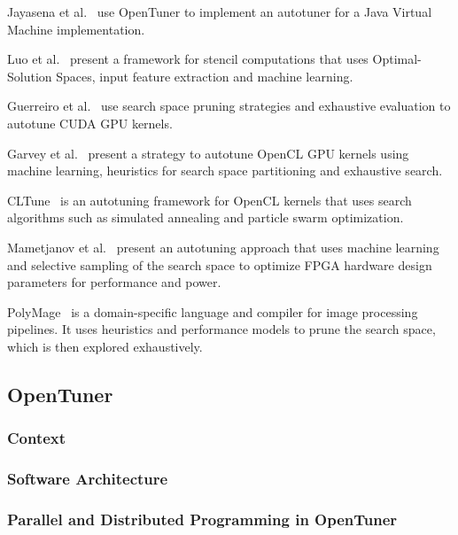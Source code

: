 Jayasena et al.~\cite{jayasena2015auto} use OpenTuner to implement an autotuner
for a Java Virtual Machine implementation.

Luo et al.~\cite{luo2015fast} present a framework for stencil computations that
uses Optimal-Solution Spaces, input feature extraction and machine learning.

Guerreiro et al.~\cite{guerreiro2015multi} use search space pruning strategies
and exhaustive evaluation to autotune CUDA GPU kernels.

Garvey et al.~\cite{garvey2015automatic} present a strategy to autotune OpenCL
GPU kernels using machine learning, heuristics for search space partitioning
and exhaustive search.

CLTune~\cite{nugteren2015cltune} is an autotuning framework for OpenCL kernels
that uses search algorithms such as simulated annealing and particle swarm
optimization.

Mametjanov et al.~\cite{mametjanov2015autotuning} present an autotuning
approach that uses machine learning and selective sampling of the search space
to optimize FPGA hardware design parameters for performance and power.

PolyMage~\cite{mullapudi2015polymage} is a domain-specific language and
compiler for image processing pipelines. It uses heuristics and performance
models to prune the search space, which is then explored exhaustively.

\subsection{OpenTuner}
\label{sec:opentuner}

\subsubsection{Context}
\label{sec:context}

\subsubsection{Software Architecture}
\label{sec:arch}

\subsubsection{Parallel and Distributed Programming in OpenTuner}
\label{sec:opentuner-parallel}

